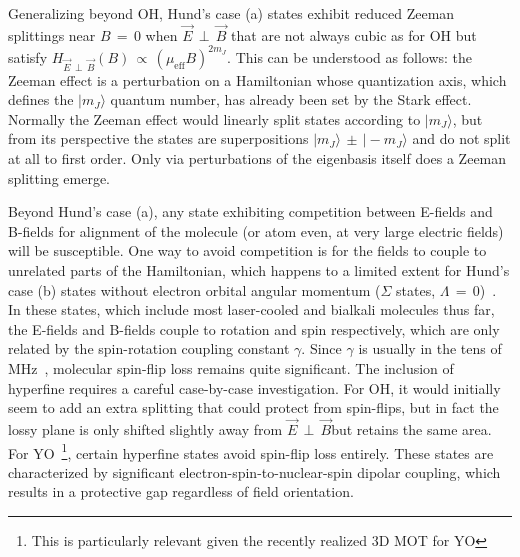 \documentclass[%
 reprint,
 amsmath,amssymb,
 aps,
prl,
]{revtex4-1}
\newcommand{\epb}{{$\vec{E}\,{\perp}\,\vec{B}$}}
\newcommand{\epbm}{{\vec{E}\,{\perp}\,\vec{B}}}
\begin{document}
Generalizing beyond OH, Hund's case (a) states exhibit reduced Zeeman splittings near $B\,{=}\,0$ when \epb{} that are not always cubic as for OH but satisfy $H_\epbm(B)\,{\propto}\,(\mu_\text{eff}B)^{2m_J}$.
This can be understood as follows: the Zeeman effect is a perturbation on a Hamiltonian whose quantization axis, which defines the $|m_J\rangle$ quantum number, has already been set by the Stark effect. 
Normally the Zeeman effect would linearly split states according to $|m_J\rangle$, but from its perspective the states are superpositions $|m_J\rangle\,{\pm}\,|\!-\!m_J\rangle$ and do not split at all to first order. 
Only via perturbations of the eigenbasis itself does a Zeeman splitting emerge.

Beyond Hund's case (a), any state exhibiting competition between E-fields and B-fields for alignment of the molecule (or atom even, at very large electric fields) will be susceptible. 
One way to avoid competition is for the fields to couple to unrelated parts of the Hamiltonian, which happens to a limited extent for Hund's case (b) states without electron orbital angular momentum ($\Sigma$ states, $\Lambda\,{=}\,0$)~\cite{Bohn2013}. 
In these states, which include most laser-cooled and bialkali molecules thus far, the E-fields and B-fields couple to rotation and spin respectively, which are only related by the spin-rotation coupling constant $\gamma$.
Since $\gamma$ is usually in the tens of MHz~\cite{Quemener2016}, molecular spin-flip loss remains quite significant.
The inclusion of hyperfine requires a careful case-by-case investigation. For OH, it would initially seem to add an extra splitting that could protect from spin-flips, but in fact the lossy plane is only shifted slightly away from \epb but retains the same area.
For YO~\footnote{This is particularly relevant given the recently realized 3D MOT for YO}, certain hyperfine states avoid spin-flip loss entirely. 
These states are characterized by significant electron-spin-to-nuclear-spin dipolar coupling, which results in a protective gap regardless of field orientation. %
\end{document}
